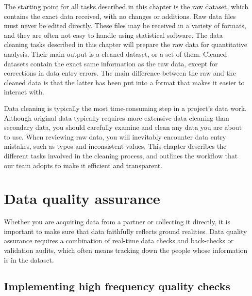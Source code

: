 
\begin{fullwidth}

The starting point for all tasks described in this chapter is the raw dataset,
which contains the exact data received, with no changes or additions.
Raw data files must never be edited directly.
These files may be received in a variety of formats, 
and they are often not easy to handle using statistical software.
The data cleaning tasks described in this chapter will prepare the raw data
for quantitative analysis.
Their main output is a cleaned dataset, or a set of them.
Cleaned datasets contain the exact same information as the raw data,
except for corrections in data entry errors.
The main difference between the raw and the cleaned data is that the latter
has been put into a format that makes it easier to interact with. 

Data cleaning is typically the most time-consuming step in a project's data work.
Although original data typically requires more extensive data cleaning than secondary data,
you should carefully examine and clean any data you are about to use.
When reviewing raw data, you will inevitably encounter data entry mistakes,
such as typos and inconsistent values.
This chapter describes the different tasks involved in the cleaning process,
and outlines the workflow that our team adopts to make it efficient and transparent.

\section{Data quality assurance}

Whether you are acquiring data from a partner or collecting it directly,
it is important to make sure that data faithfully reflects ground realities.
Data quality assurance requires a combination of real-time data checks
and back-checks or validation audits, which often means tracking down
the people whose information is in the dataset.

\subsection{Implementing high frequency quality checks}


\end{fullwidth}
